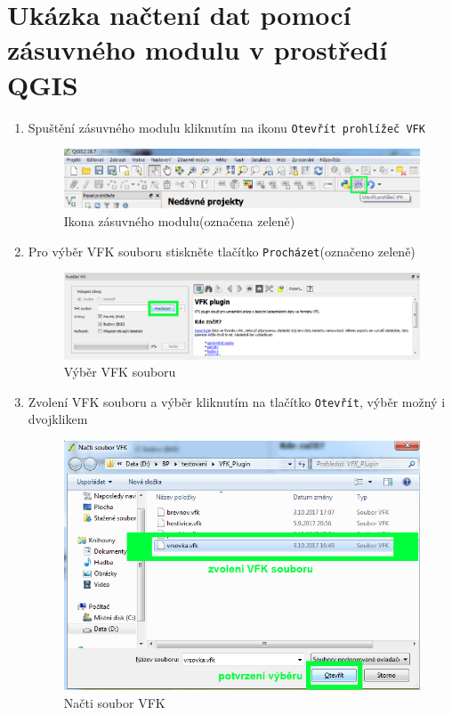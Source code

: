  \section{Ukázka načtení dat pomocí zásuvného modulu v prostředí QGIS}
 \begin{enumerate}
 \item{Spuštění zásuvného modulu kliknutím na ikonu \texttt{Otevřít prohlížeč VFK}}
  \begin{figure}[H]
	 \centering
      \includegraphics[width=15cm]{./pictures/nacteni_1kr.png}
      \caption{Ikona zásuvného modulu(označena zeleně)}
      \label{fig:1kr_nacteni}
  \end{figure}
  
  \item{Pro výběr VFK souboru stiskněte tlačítko \texttt{Procházet}(označeno zeleně)}
  \begin{figure}[H]
	 \centering
      \includegraphics[width=15cm]{./pictures/nacteni_2kr.png}
      \caption{Výběr VFK souboru}
      \label{fig:2kr_nacteni}
  \end{figure}
  
  \item{Zvolení VFK souboru a výběr kliknutím na tlačítko \texttt{Otevřít}, výběr možný i dvojklikem}
  \begin{figure}[H]
	 \centering
      \includegraphics[width=15cm]{./pictures/nacteni_3kr.png}
      \caption{Načti soubor VFK}
      \label{fig:3kr_nacteni}
  \end{figure}
  

\end{enumerate}
